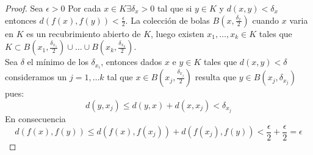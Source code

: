 \begin{proof}
    Sea $\epsilon > 0 $ Por cada $x \in K \exists \delta_x > 0 $ tal que si $y \in K$ y $d(x, y) < \delta_x$ entonces $d(f(x), f(y)) < \frac{\epsilon}{2}$. La colección de bolas $B(x, \frac{\delta_x}{2})$ cuando $x$ varia en $K$ es un recubrimiento abierto de $K$, luego existen $x_1, \ldots, x_k \in K$ tales que $K \subset B(x_1, \frac{\delta_{x_1}}{2}) \cup \ldots \cup B(x_k, \frac{\delta_{x_k}}{2})$. \\
    Sea $\delta$ el mínimo de los $\delta_{x_i}$, entonces dados $x$ e $y \in K$ tales que $d(x,y) < \delta$ consideramos un $j= 1, \ldots k$ tal que $x \in B(x_j, \frac{\delta_{x_j}}{2})$ resulta que $y \in B(x_j, \delta_{x_j})$ pues: 
    $$d(y, x_j) \leq d(y, x) + d(x, x_j) < \delta_{x_j}$$
    En consecuencia
    $$d(f(x), f(y)) \leq d(f(x), f(x_j)) + d(f(x_j), f(y)) < \frac{\epsilon}{2} + \frac{\epsilon}{2} = \epsilon$$
\end{proof}